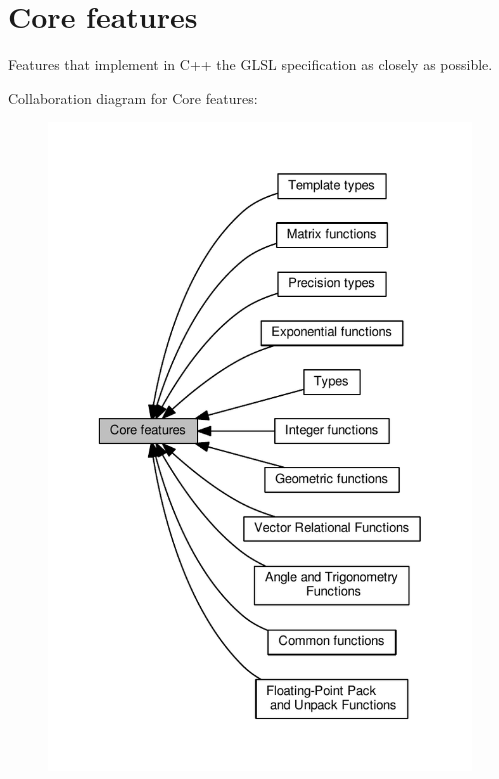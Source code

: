 \hypertarget{group__core}{}\section{Core features}
\label{group__core}


Features that implement in C++ the G\+L\+SL specification as closely as possible.  


Collaboration diagram for Core features\+:
\nopagebreak
\begin{figure}[H]
\begin{center}
\leavevmode
\includegraphics[width=329pt]{d0/de1/group__core}
\end{center}
\end{figure}
